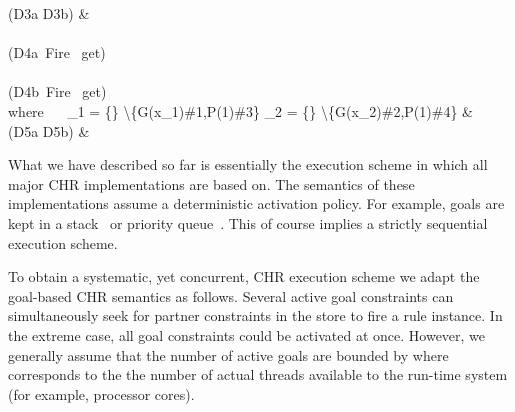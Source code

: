 \documentclass{tlp}
\begin{document}
{{{{{{       \mbox{(D3a} \mid\mid \mbox{D3b)} \sgap \partranssf{\{\} \backslash \{\}} 
          & 
      \ea \\ \\
       \mbox{(D4a Fire } get) \sgap {}
           \\
       \sgap \mid\mid \sgap \\      
       \mbox{(D4b Fire } get) \sgap {}  \\
        \mbox{where} ~~ \delta_1 = \{\} \backslash \{G(x_1)\#1,P(1)\#3\} \sgap
       \delta_2 = \{\} \backslash \{G(x_2)\#2,P(1)\#4\} 
      \ea
     \ea
    }
    {
     {
          &  \\
       \mbox{(D5a} \mid\mid \mbox{D5b)} \sgap \partranssf{\{\} \backslash \{\}} & 
      \ea
     }
    }
   }
  }
 }
\ea
\eda
}
}

What we have described so far is essentially the execution scheme in which all 
major CHR implementations are based on. 
The semantics of these implementations assume a deterministic activation policy.
For example, goals are kept in a stack~\cite{DuckSBH04}
or priority queue~\cite{rp-chr}. This of course implies a strictly sequential
execution scheme.

To obtain a systematic, yet concurrent, CHR execution scheme we adapt
the goal-based CHR semantics as follows. Several active goal constraints
can simultaneously 
seek for partner constraints in the store to fire a rule instance. In the extreme 
case, all goal constraints could be activated at once. However, we generally assume 
that the number of active goals are bounded by  where  corresponds to 
the the number of actual threads available to the run-time system (for example, processor cores).
\end{document}
